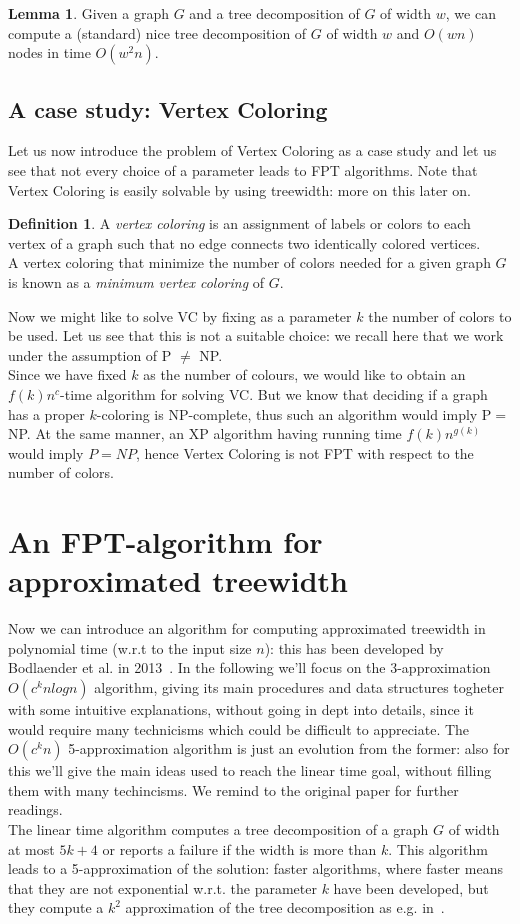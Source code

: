\documentclass{article}
\theoremstyle{definition}
\newtheorem{definition}{Definition}[section]
\theoremstyle{lemma}
\newtheorem{lemma}{Lemma}[section]
\theoremstyle{corollary}
\theoremstyle{theorem}
\begin{document}
\begin{lemma}
	Given a graph $G$ and a tree decomposition of $G$ of width $w$, we can compute a (standard)
	nice tree decomposition of $G$ of width $w$ and $O(wn)$ nodes in time $O(w^2n)$.
\end{lemma}

\subsection{A case study: Vertex Coloring}
Let us now introduce the problem of Vertex Coloring as a case study and let us see that not every choice of a parameter leads to FPT algorithms. Note that Vertex Coloring is easily solvable by using treewidth: more on this later on.
\theoremstyle{definition}
\begin{definition}
	A \emph{vertex coloring} is an assignment of labels or colors to each vertex of a graph
	such that no edge connects two identically colored vertices. \\
	A vertex coloring that minimize the number of colors needed for a given graph $G$ is 
	known as a \emph{minimum vertex coloring} of $G$.
\end{definition}
Now we might like to solve VC by fixing as a parameter $k$ the number of colors to be used. Let us see that this is not a suitable choice: we recall here that we work under the assumption of P 
$\not =$ NP.~\cite{palgo} \\
Since we have fixed $k$ as the number of colours, we would like to obtain an $f(k)n^c$-time algorithm for solving VC. But we know that deciding if a graph has a proper $k$-coloring is NP-complete, thus such an algorithm would imply P$=$NP. At the same manner, an XP algorithm having running time $f(k)n^{g(k)}$ would imply $P = NP$, hence Vertex Coloring is not FPT with respect to the number of colors.

\section{An FPT-algorithm for approximated treewidth}
Now we can introduce an algorithm for computing approximated treewidth in polynomial time (w.r.t to the input size $n$): this has been developed by Bodlaender et al. in 2013~\cite{approx}. In the following we'll focus on the 3-approximation $O(c^k nlogn)$ algorithm, giving its main procedures and data structures togheter with some intuitive explanations, without going in dept into details, since it would require many technicisms which could be difficult to appreciate. The $O(c^k n)$ 5-approximation algorithm is just an evolution from the former: also for this we'll give the main ideas used to reach the linear time goal, without filling them with many techincisms. We remind to the original paper for further readings. \\
The linear time algorithm computes a tree decomposition of a graph $G$ of width at most $5k+4$ or reports a failure if the width is more than $k$. This algorithm leads to a 5-approximation of the solution: faster algorithms, where faster means that they are not exponential w.r.t. the parameter $k$ have been developed, but they compute a $k^2$ approximation of the tree decomposition as e.g. in~\cite{k2algo}.
\end{document}
